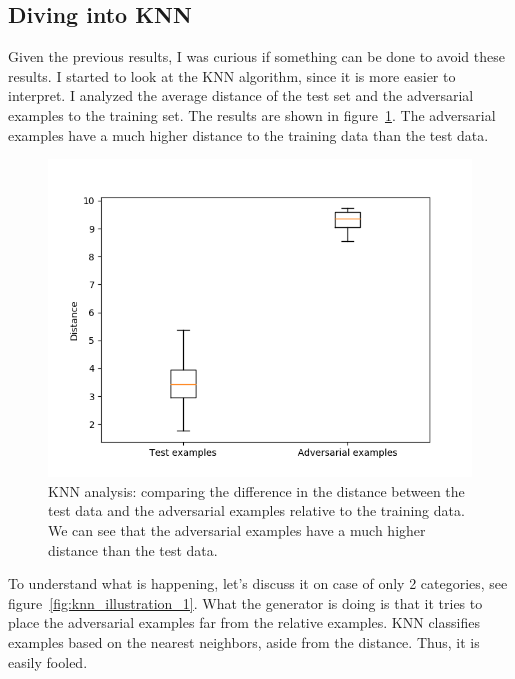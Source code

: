   \subsection{Diving into KNN}
    \par Given the previous results, I was curious if something can be done to avoid these results. I started to look at the KNN algorithm, since it is more easier to interpret. I analyzed the average distance of the test set and the adversarial examples to the training set. The results are shown in figure~\ref{fig:knn_analysis}. The adversarial examples have a much higher distance to the training data than the test data.
    \begin{figure}[!htbp]
      \centering
      \includegraphics[scale=1.0]{images/adv_attack/knn_analysis.png}
      \caption{KNN analysis: comparing the difference in the distance between the test data and the adversarial examples relative to the training data. We can see that the adversarial examples have a much higher distance than the test data.}
      \label{fig:knn_analysis}
    \end{figure}

    \par To understand what is happening, let's discuss it on case of only 2 categories, see figure~\ref{fig:knn_illustration_1}. What the generator is doing is that it tries to place the adversarial examples far from the relative examples. KNN classifies examples based on the nearest neighbors, aside from the distance. Thus, it is easily fooled.

